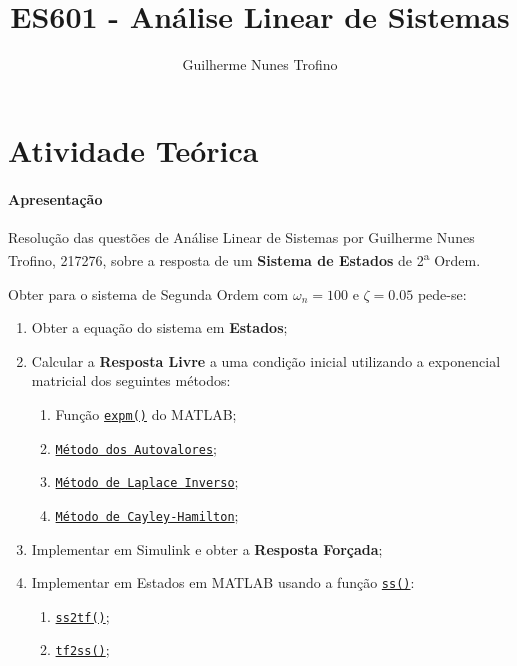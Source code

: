 \documentclass{article}
\title{ES601 - Análise Linear de Sistemas}
\author{Guilherme Nunes Trofino}
\begin{document}
    \maketitle
\newpage

\section{Atividade Teórica}
    \paragraph{Apresentação}Resolução das questões de Análise Linear de Sistemas por Guilherme Nunes Trofino, 217276, sobre a resposta de um \textbf{Sistema de Estados} de 2\textsuperscript{a} Ordem.
    \begin{exercise}
        Obter para o sistema de Segunda Ordem com $\omega_{n} = 100$ e $\zeta = 0.05$ pede-se:
        \begin{enumerate}
            \item\label{1} Obter a equação do sistema em \textbf{Estados};

            \item\label{2} Calcular a \textbf{Resposta Livre} a uma condição inicial utilizando a exponencial matricial dos seguintes métodos:
            \begin{enumerate}[rightmargin = \leftmargin, noitemsep]
                \item\label{2A} Função \href{https://www.mathworks.com/help/matlab/ref/expm.html}{\texttt{expm()}} do MATLAB;
                \item\label{2B} \href{https://en.wikipedia.org/wiki/Matrix_exponential}{\texttt{Método dos Autovalores}};
                \item\label{2C} \href{https://en.wikipedia.org/wiki/Matrix_exponential}{\texttt{Método de Laplace Inverso}};
                \item\label{2D} \href{https://en.wikipedia.org/wiki/Matrix_exponential}{\texttt{Método de Cayley-Hamilton}};
            \end{enumerate}

            \item\label{3} Implementar em  Simulink e obter a \textbf{Resposta Forçada};

            \item\label{4} Implementar em Estados em MATLAB usando a função \href{https://www.mathworks.com/help/control/ref/ss.html}{\texttt{ss()}}:
            \begin{enumerate}[rightmargin = \leftmargin, noitemsep]
                \item\label{4A} \href{https://www.mathworks.com/help/matlab/ref/ss2tf.html}{\texttt{ss2tf()}};
                \item\label{4B} \href{https://www.mathworks.com/help/signal/ref/tf2ss.html}{\texttt{tf2ss()}};
            \end{enumerate}


\end{enumerate}
\end{exercise}
\end{document}
